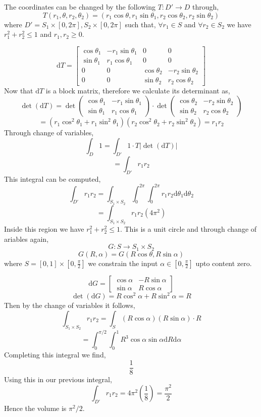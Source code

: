 \documentclass[letter]{article}
\begin{document}
The coordinates can be changed by the following 
$T : D' \to  D$ through, 
\[
T(r_1, \theta, r_2 , \theta_2) = 
(r_1 \cos \theta , r_1 \sin \theta_1, r_2 \cos \theta_2, r_2 \sin \theta_2  )
\] 
where $D' = S_1 \times [0, 2\pi], S_2 \times [0, 2\pi] $ such that, $\forall  r_1 \in S$ and  $\forall  r_2 \in S_2$ we have $r_1 ^2 + r_2^2 \le 1$ and $r_1, r_2 \ge 0$. 

\[
\mathrm{d} T = 
\begin{bmatrix} \cos \theta_1 & 
- r_1 \sin \theta_1 & 0 & 0 \\ 
\sin \theta_1 & r_1 \cos \theta_1 & 0 & 0 \\
0 & 0 & \cos \theta_2 & -r_2 \sin \theta_2 \\
0 & 0 & \sin \theta_2 & r_2 \cos \theta_2 \end{bmatrix} 
\]
Now that $\mathrm{d} T$ is a block matrix, therefore we calculate its determinant as, 
\[
\det (\mathrm{d} T) = 
\det 
\begin{pmatrix} \cos \theta_1 & -r_1 \sin \theta_1 \\ 
\sin \theta_1 & r_1 \cos \theta_1 \end{pmatrix} 
\cdot 
\det 
	\begin{pmatrix} \cos \theta_2 & -r_2 \sin \theta_2 \\
	\sin \theta_2 & r_2 \cos \theta_2\end{pmatrix} 
\] 
\[
= (r_1 \cos ^2 \theta_1 + r_1 \sin ^2 \theta_1) \left(r_2 \cos ^2 \theta_2 + r_2 \sin^2 \theta_2\right) = r_1 r_2
\]
Through change of variables, 
\[
	\int_D 1 = \int_{D'} 1 \cdot T | \det (\mathrm{d} T)| 
\] 
\[
	= \int_{D'} r_1 r_2 
\]
This integral can be computed, 
\[
	\int_{D'} r_1 r_2 = 
	\int_{S_1 \times S_2} \int_{0}^{2 \pi } \int_{0}^{ 2 \pi } 
	r_1 r_2 \mathrm{d} \theta_1 \mathrm{d} \theta_2
\] 
\[
	= \int_{S_1 \times S_2} r_1 r_2 (4 \pi ^2)
\] 
Inside this region we have $r_1 ^2 + r_2^2 \le 1$. This is a unit circle and through change of ariables again, 
\[
G: S \to  S_1 \times S_2
\] 
\[
G (R , \alpha) = G(R \cos \theta, R \sin \alpha)
\] where $S = [ 0, 1] \times [0, \frac{\pi}{2} ] $ we constrain the input $\alpha \in  [ 0, \frac{\pi}{2}] $ upto content zero. 

\[
	\mathrm{d} G = \begin{bmatrix} \cos \alpha & - R \sin \alpha \\
	\sin \alpha & R \cos \alpha\end{bmatrix} 
\]
\[
\det (\mathrm{d} G) = R \cos ^2 \alpha + R \sin ^2 \alpha = R
\]
Then by the change of variables it follows, 
\[
	\int_{S_1 \times S_2} r_1 r_2 = \int_S (R \cos \alpha) (R \sin \alpha) \cdot  R
\] 
\[
= \int_{0}^{\pi / 2}  \int_{0 }^{1}  R^3 \cos \alpha \sin \alpha \mathrm{d} R \mathrm{d} \alpha  
\]
Completing this integral we find, 
\[
\boxed{
\frac{1}{8}
}
\] 
Using this in our previous integral, \[
	\int_{D'} r_1 r_2 = 4 \pi ^2 \left(\frac{1}{ 8}\right) = \frac{\pi^2}{2 }
\] 
Hence the volume is $\pi^2 / 2$. 
\end{document}
